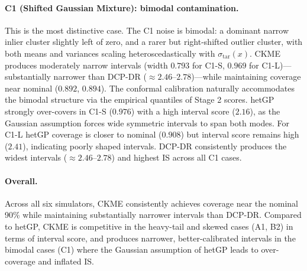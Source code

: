\documentclass[11pt]{article}
\begin{document}
\paragraph{C1 (Shifted Gaussian Mixture): bimodal contamination.}
This is the most distinctive case.
The C1 noise is bimodal: a dominant narrow inlier cluster slightly left of zero, and a rarer but right-shifted outlier cluster, with both means and variances scaling heteroscedastically with $\sigma_{\mathrm{tar}}(x)$.
CKME produces moderately narrow intervals (width $0.793$ for C1-S, $0.969$ for C1-L)---substantially narrower than DCP-DR ($\approx 2.46$--$2.78$)---while maintaining coverage near nominal ($0.892$, $0.894$).
The conformal calibration naturally accommodates the bimodal structure via the empirical quantiles of Stage 2 scores.
hetGP strongly over-covers in C1-S ($0.976$) with a high interval score ($2.16$), as the Gaussian assumption forces wide symmetric intervals to span both modes.
For C1-L hetGP coverage is closer to nominal ($0.908$) but interval score remains high ($2.41$), indicating poorly shaped intervals.
DCP-DR consistently produces the widest intervals ($\approx 2.46$--$2.78$) and highest IS across all C1 cases.

\paragraph{Overall.}
Across all six simulators, CKME consistently achieves coverage near the nominal 90\% while maintaining substantially narrower intervals than DCP-DR.
Compared to hetGP, CKME is competitive in the heavy-tail and skewed cases (A1, B2) in terms of interval score, and produces narrower, better-calibrated intervals in the bimodal cases (C1) where the Gaussian assumption of hetGP leads to over-coverage and inflated IS.
\end{document}
